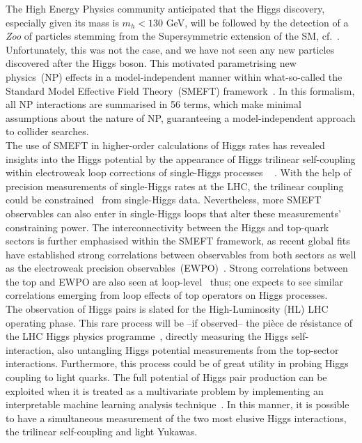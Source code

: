 The High Energy Physics community anticipated that the Higgs discovery, especially given its mass is $ m_h <130$ GeV, will be followed by the detection of a \emph{Zoo} of particles stemming from the Supersymmetric extension of the SM, cf.~\cite{handle:20.500.11811/5384}. Unfortunately, this was not the case, and we have not seen any new particles discovered after the Higgs boson. This motivated parametrising new physics~(NP) effects in a model-independent manner within what-so-called the Standard Model Effective Field Theory~(SMEFT) framework~\cite{Grzadkowski:2010es,Alonso:2013hga}. In this formalism, all NP interactions are summarised in 56 terms, which make minimal assumptions about the nature of NP, guaranteeing a model-independent approach to collider searches. \\ 
%
The use of SMEFT in higher-order calculations of Higgs rates has revealed insights into the Higgs potential by the appearance of Higgs trilinear self-coupling within electroweak loop corrections of single-Higgs processes ~\cite{DiVita:2017vrr} . With the help of precision measurements of single-Higgs rates at the LHC, the trilinear coupling could be constrained~\cite{DiMicco:2019ngk} from single-Higgs data. Nevertheless, more SMEFT observables can also enter in single-Higgs loops that alter these measurements' constraining power. The interconnectivity between the Higgs and top-quark sectors is further emphasised within the SMEFT framework, as recent global fits have established strong correlations between observables from both sectors as well as the electroweak precision observables~(EWPO)~\cite{Ellis:2020unq}. Strong correlations between the top and EWPO are also seen at loop-level~\cite{Dawson:2020oco} thus; one expects to see similar correlations emerging from loop effects of top operators on Higgs processes. \\
The observation of Higgs pairs is slated for the High-Luminosity (HL) LHC operating phase. This rare process will be --if observed-- the pi\`ece de r\'esistance of the LHC Higgs physics programme~\cite{Bernius:2666331}, directly measuring the Higgs self-interaction, also untangling Higgs potential measurements from the top-sector interactions. Furthermore,  this process could be of great utility in probing Higgs coupling to light quarks. The full potential of Higgs pair production can be exploited when it is treated as a multivariate problem by implementing an interpretable machine learning analysis technique~\cite{Grojean:2020ech}. In this manner, it is possible to have a simultaneous measurement of the two most elusive Higgs interactions, the trilinear self-coupling and light Yukawas.\\
